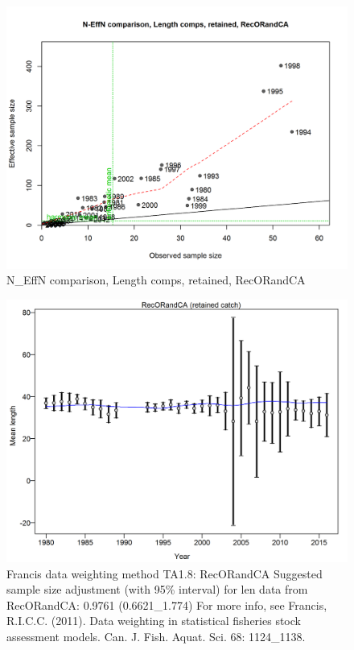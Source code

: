 \documentclass[12pt,]{article}
\begin{document}
\begin{figure}[htbp]
\centering
\includegraphics{./r4ss/plots_mod1/comp_lenfit_sampsize_flt3mkt2.png}
\caption{N\_EffN comparison, Length comps, retained, RecORandCA
\label{fig:mod1_16_comp_lenfit_sampsize_flt3mkt2}}
\end{figure}

\begin{figure}[htbp]
\centering
\includegraphics{./r4ss/plots_mod1/comp_lenfit_data_weighting_TA1.8_RecORandCA.png}
\caption{Francis data weighting method TA1.8: RecORandCA Suggested
sample size adjustment (with 95\% interval) for len data from
RecORandCA: 0.9761 (0.6621\_1.774) For more info, see Francis, R.I.C.C.
(2011). Data weighting in statistical fisheries stock assessment models.
Can. J. Fish. Aquat. Sci. 68: 1124\_1138.
\label{fig:mod1_17_comp_lenfit_data_weighting_TA1.8_RecORandCA}}
\end{figure}
\end{document}
